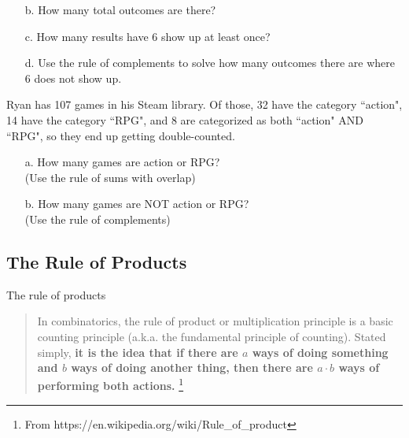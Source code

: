 {\begin{questionNOGRADE}{\thequestion}
\begin{enumerate}
            \item[b.]   How many total outcomes are there?

            \item[c.]   How many results have 6 show up at least once?

            \item[d.]   Use the rule of complements to solve how many
                        outcomes there are where 6 does not show up.
        \end{enumerate}
    \end{questionNOGRADE}

    \begin{questionNOGRADE}{\thequestion}
            Ryan has 107 games in his Steam library.
            Of those, 32 have the category ``action",
            14 have the category ``RPG",
            and 8 are categorized as both ``action" AND ``RPG", so they end up getting double-counted.

        \begin{enumerate}
            \item[a.] How many games are action or RPG? \\(Use the rule of sums with overlap)
            \item[b.] How many games are NOT action or RPG? \\(Use the rule of complements)
        \end{enumerate}        
    \end{questionNOGRADE}

    \hrulefill

    \subsection{The Rule of Products}

    \begin{intro}{The rule of products}
        \begin{quote}
        In combinatorics, the rule of product or multiplication principle is a
        basic counting principle (a.k.a. the fundamental principle of counting).
        Stated simply,
        \textbf{it is the idea that if there are $a$ ways of doing something and $b$
        ways of doing another thing, then there are $a \cdot b$ ways of performing both actions.}
        \footnote{From https://en.wikipedia.org/wiki/Rule\_of\_product}
        \end{quote}
    \end{intro}

}
